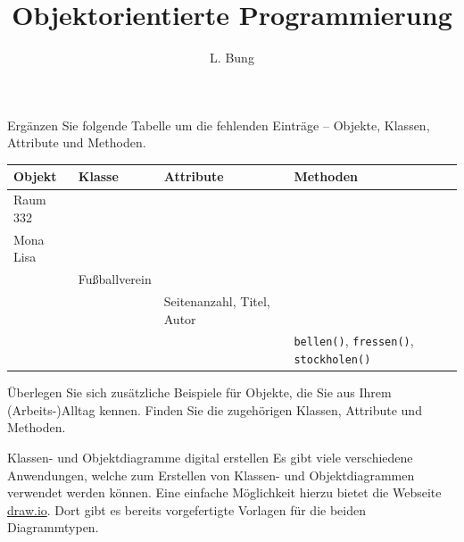 \documentclass[11pt, a4paper, oneside]{article}
\begin{document}
	\author{L. Bung}
	\title{Objektorientierte \hspace{10cm} Programmierung}
	\subject{SAE}
	\maketitle
	
	
	Ergänzen Sie folgende Tabelle um die fehlenden Einträge -- Objekte, Klassen, Attribute und Methoden.
	
	\begin{table}[h]
		\centering
		\setlength\tabcolsep{.25cm}
		\renewcommand{\arraystretch}{1.5}
		\begin{tabularx}{\textwidth}{|X|X|X|X|}
			\hline
			\textbf{Objekt} & \textbf{Klasse} & \textbf{Attribute} & \textbf{Methoden}\\
			\hline
			Raum 332\vspace{1cm} & & &\\
			\hline
			Mona Lisa\vspace{1cm} &&&\\
			\hline
			& Fußballverein\vspace{1cm} & &\\
			\hline
			&& Seitenanzahl, Titel, Autor\vspace{.5cm} &\\
			\hline
			&&&\texttt{bellen()}, \texttt{fressen()}, \texttt{stockholen()}\\
			\hline
		\end{tabularx}
	\end{table}

	
	Überlegen Sie sich zusätzliche Beispiele für Objekte, die Sie aus Ihrem (Arbeits-)Alltag kennen.
	Finden Sie die zugehörigen Klassen, Attribute und Methoden.
	
	\pagebreak
	
	\begin{hint}{Klassen- und Objektdiagramme digital erstellen}
		Es gibt viele verschiedene Anwendungen, welche zum Erstellen von Klassen- und Objektdiagrammen verwendet werden können.
		Eine einfache Möglichkeit hierzu bietet die Webseite \href{https://www.draw.io}{draw.io}.
		Dort gibt es bereits vorgefertigte Vorlagen für die beiden Diagrammtypen.
	\end{hint}
	
\end{document}
